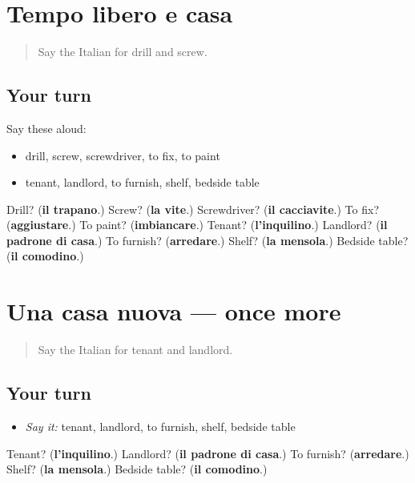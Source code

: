 \section[(dialogue)]{Tempo libero e casa}

\label{lesson:IT-R536-ripasso-535-536}



\begin{quote}
Say the Italian for drill and screw.
\end{quote}

\subsection*{Your turn}
Say these aloud:

\begin{itemize}
\raggedright
  \item drill, screw, screwdriver, to fix, to paint
  \item tenant, landlord, to furnish, shelf, bedside table
\end{itemize}

\begin{tcolorbox}[breakable,colback=teal!4,colframe=teal!35!black,title={Before you move on}]
Drill? (\textbf{il trapano}.) Screw? (\textbf{la vite}.) Screwdriver? (\textbf{il cacciavite}.) To fix? (\textbf{aggiustare}.) To paint? (\textbf{imbiancare}.) Tenant? (\textbf{l'inquilino}.) Landlord? (\textbf{il padrone di casa}.) To furnish? (\textbf{arredare}.) Shelf? (\textbf{la mensola}.) Bedside table? (\textbf{il comodino}.)
\end{tcolorbox}
\section[(dialogue)]{Una casa nuova — once more}

\label{lesson:IT-R536-ripasso-final-536}



\begin{quote}
Say the Italian for tenant and landlord.
\end{quote}

\subsection*{Your turn}
\begin{itemize}
\raggedright
  \item \emph{Say it:} tenant, landlord, to furnish, shelf, bedside table
\end{itemize}

\begin{tcolorbox}[breakable,colback=teal!4,colframe=teal!35!black,title={Before you move on}]
Tenant? (\textbf{l'inquilino}.) Landlord? (\textbf{il padrone di casa}.) To furnish? (\textbf{arredare}.) Shelf? (\textbf{la mensola}.) Bedside table? (\textbf{il comodino}.)
\end{tcolorbox}
